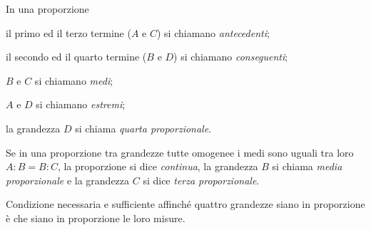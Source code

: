 \begin{definizione}
In una proporzione
\begin{itemize*}
\item il primo ed il terzo termine (\(A\) e \(C\)) si chiamano 
\emph{antecedenti};
\item il secondo ed il quarto termine (\(B\) e \(D\)) si chiamano 
\emph{conseguenti};
\item \(B\) e \(C\) si chiamano \emph{medi};
\item \(A\) e \(D\) si chiamano \emph{estremi};
\item la grandezza \(D\) si chiama \emph{quarta proporzionale}.
\end{itemize*}
\end{definizione}

\begin{definizione}
Se in una proporzione tra grandezze tutte omogenee i medi sono uguali 
tra loro \(A : B = B : C\), la proporzione si dice \emph{continua}, la 
grandezza \(B\) si chiama \emph{media proporzionale} e la grandezza \(C\) 
si dice \emph{terza proporzionale}.
\end{definizione}

\begin{teorema}\label{teo:fond_prop}
Condizione necessaria e sufficiente affinché quattro grandezze siano 
in proporzione è che siano in proporzione le loro misure.
\end{teorema}

